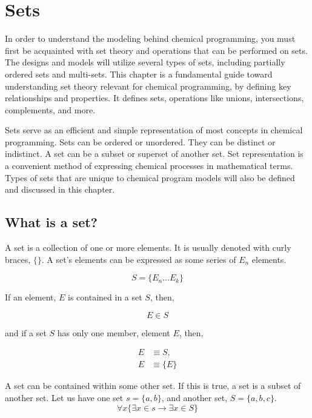 
\chapter{Sets}

\par In order to understand the modeling behind chemical programming, you must first be acquainted with set theory and operations that can be performed on sets. The designs and models will utilize several types of sets, including partially ordered sets and multi-sets. This chapter is a fundamental guide toward understanding set theory relevant for chemical programming, by defining key relationships and properties. It defines sets, operations like unions, intersections, complements, and more. 

\par Sets serve as an efficient and simple representation of most concepts in chemical programming. Sets can be ordered or unordered. They can be distinct or indistinct. A set can be a subset or superset of another set. Set representation is a convenient method of expressing chemical processes in mathematical terms. Types of sets that are unique to chemical program models will also be defined and discussed in this chapter.

\section{What is a set?}

A set is a collection of one or more elements. It is usually denoted with curly braces, $\{\}$. A set's elements can be expressed as some series of $E_n$ elements.

$$
 S = \{E_n \dots E_k\}
$$

If an element, $E$ is contained in a set $S$, then,

$$
E \in S
$$

and if a set $S$ has only one member, element $E$, then,

\begin{align*}
E &\equiv S, \\
E &\equiv \{E\}
\end{align*}

A set can be contained within some other set. If this is true, a set is a subset of another set. Let us have one set $s = \{a, b\}$, and another set, $S = \{a, b, c\}$.
$$
\forall x  \{\exists x \in s \rightarrow \exists x \in S \}
$$

